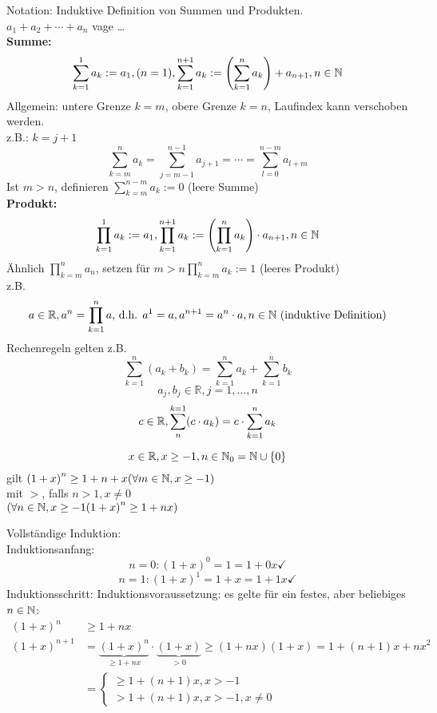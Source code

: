 \documentclass[../ana1.tex]{subfiles}
\begin{document}
Notation: Induktive Definition von Summen und Produkten.\\
\(a_1+a_2+\cdots + a_n\) vage \dots \\
\textbf{Summe:} \[\sum_{k=1}^{1} a_k := a_1, (n = 1), \sum_{k=1}^{n+1} a_k := \left( \sum_{k=1}^{n} a_k\right) + a_{n+1}, n\in\mathbb{N} \]
Allgemein: untere Grenze \(k=m\), obere Grenze \(k=n\), Laufindex kann verschoben werden.\\
z.B.: \(k= j+1\)
\[\sum_{k=m}^{n}a_k = \sum_{j=m-1}^{n-1}a_{j+1} = \cdots = \sum_{l = 0}^{n-m}a_{l+m}\]
Ist \(m>n\), definieren \( \sum_{k=m}^{n-m}a_k := 0\) (leere Summe)\\
\textbf{Produkt:} \[ \prod_{k=1}^{1}a_k := a_1, \prod_{k=1}^{n+1}a_k := \left( \prod_{k=1}^{n}a_k\right) \cdot a_{n+1}, n\in\mathbb{N} \]
Ähnlich \( \prod_{k=m}^{n}a_n\), setzen für \(m>n \prod_{k=m}^n a_k := 1\) (leeres Produkt)\\
z.B. \[a\in\mathbb{R}, a^n = \prod_{k=1}^n a \text{, d.h. } a^1=a, a^{n+1} = a^n \cdot a, n\in\mathbb{N} \text{ (induktive Definition)}\]
Rechenregeln gelten z.B. \[ \sum_{k=1}^{n} (a_k+b_k) = \sum_{k=1}^{n} a_k + \sum_{k=1}^{n} b_k\]
\[a_j, b_j \in\mathbb{R}, j=1,\ldots, n\]
\[c \in\mathbb{R}, \sum_{n}^{k=1} (c\cdot a_k) = c\cdot \sum_{k=1}^{n} a_k\]
\begin{satz}
	\[x\in\mathbb{R}, x\geq -1, n\in\mathbb{N}_0 = \mathbb{N}\cup \{0\} \]
	gilt \({(1+x)}^n \geq 1+ n + x (\forall m\in\mathbb{N},x\geq -1)\) \\
	mit \glqq{}\(>\)\grqq, falls \(n>1, x\neq 0\) \\
	\((\forall n\in\mathbb{N}, x \geq -1{(1+x)}^n \geq 1 + nx)\)
\end{satz}
\begin{bew}
	Vollständige Induktion:\\
	Induktionsanfang:
	\[n=0: {(1+x)}^0=1=1+0x \checkmark \]
	\[n=1: {(1+x)}^1=1+x=1+1x \checkmark \]
	Induktionsschritt:
	Induktionsvoraussetzung: es gelte für ein festes, aber beliebiges \(n\in\mathbb{N} \):
	\begin{equation*}
		\begin{aligned}
			{(1+x)}^n     & \geq 1+nx \\%
			{(1+x)}^{n+1} & = \underbrace{{(1+x)}^{n}}_{\geq 1+nx} \cdot \underbrace{(1+x)}_{> 0} \geq (1+nx)(1+x) = 1+(n+1)x + nx^2 \\
			              & =\begin{cases}
							\geq 1+(n+1)x, x>-1 \\
							> 1+(n+1)x, x>-1, x\neq 0
							\end{cases}
		\end{aligned}
	\end{equation*}
\end{bew}
\end{document}

